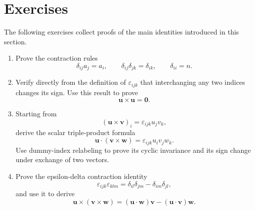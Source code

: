 
\section*{Exercises}
The following exercises collect proofs of the main identities introduced in this section.

\renewcommand{\theenumi}{\thechapter.\arabic{enumi}}
\renewcommand{\labelenumi}{\theenumi.}
\begin{enumerate}
    \item\label{ex:index-delta} Prove the contraction rules
    \begin{equation*}
        \delta_{ij}a_j=a_i,
        \qquad
        \delta_{ij}\delta_{jk}=\delta_{ik},
        \qquad
        \delta_{ii}=n.
    \end{equation*}

    \item\label{ex:index-epsilon} Verify directly from the definition of $\varepsilon_{ijk}$ that interchanging any two indices changes its sign. Use this result to prove
    \begin{equation*}
        \mathbf{u}\times\mathbf{u}=\mathbf{0}.
    \end{equation*}

    \item\label{ex:index-scalar-triple} Starting from
    \begin{equation*}
        (\mathbf{u}\times\mathbf{v})_i=\varepsilon_{ijk}u_jv_k,
    \end{equation*}
    derive the scalar triple-product formula
    \begin{equation*}
        \mathbf{u}\cdot(\mathbf{v}\times\mathbf{w})
        =\varepsilon_{ijk}u_iv_jw_k.
    \end{equation*}
    Use dummy-index relabeling to prove its cyclic invariance and its sign change under exchange of two vectors.

    \item\label{ex:index-triple} Prove the epsilon-delta contraction identity
    \begin{equation*}
        \varepsilon_{ijk}\varepsilon_{klm}
        =\delta_{il}\delta_{jm}-\delta_{im}\delta_{jl},
    \end{equation*}
    and use it to derive
    \begin{equation*}
        \mathbf{u}\times(\mathbf{v}\times\mathbf{w})
        =(\mathbf{u}\cdot\mathbf{w})\mathbf{v}
        -(\mathbf{u}\cdot\mathbf{v})\mathbf{w}.
    \end{equation*}


\end{enumerate}
